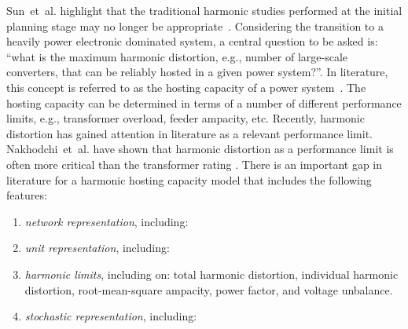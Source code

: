 Sun~et~al. highlight that the traditional harmonic studies performed at the initial planning stage may no longer be appropriate~\cite{sun_distribution_2022}. Considering the transition to a heavily power electronic dominated system, a central question to be asked is: “what is the maximum harmonic distortion, e.g., number of large-scale converters, that can be reliably hosted in a given power system?”. In literature, this concept is referred to as the hosting capacity of a power system~\cite{bollen_hosting_2017,koirala_hosting_2022}. The hosting capacity can be determined in terms of a number of different performance limits, e.g., transformer overload, feeder ampacity, etc. Recently, harmonic distortion has gained attention in literature as a relevant performance limit. Nakhodchi~et~al. have shown that harmonic distortion as a performance limit is often more critical than the transformer rating \cite{nakhodchi_impact_2023}. There is an important gap in literature for a harmonic hosting capacity model that includes the following features: 
\begin{enumerate}
    \item [1)] \textit{network representation}, including:
    \item [2)] \textit{unit representation}, including:
    \item [3)] \textit{harmonic limits}, including on: total harmonic distortion, individual harmonic distortion, root-mean-square ampacity, power factor, and voltage unbalance.
    \item [4)] \textit{stochastic representation}, including:
\end{enumerate}

